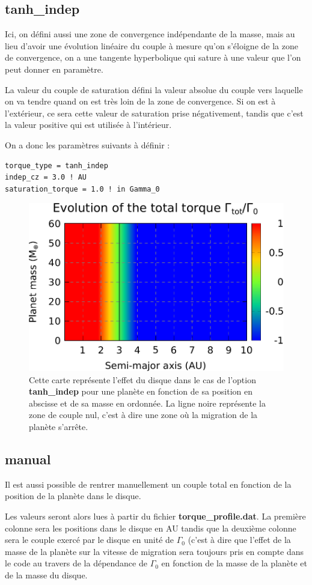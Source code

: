 \subsection{tanh\_indep}\label{sec:tanh_indep}
Ici, on défini aussi une zone de convergence indépendante de la masse, mais au lieu d'avoir une évolution linéaire du couple à mesure qu'on s'éloigne de la zone de convergence, on a une tangente hyperbolique qui sature à une valeur que l'on peut donner en paramètre. 

La valeur du couple de saturation défini la valeur absolue du couple vers laquelle on va tendre quand on est très loin de la zone de convergence. Si on est à l'extérieur, ce sera cette valeur de saturation prise négativement, tandis que c'est la valeur positive qui est utilisée à l'intérieur.

On a donc les paramètres suivants à définir : 
\begin{verbatim}
torque_type = tanh_indep
indep_cz = 3.0 ! AU
saturation_torque = 1.0 ! in Gamma_0
\end{verbatim}

\begin{figure}[htb]
\centering
\includegraphics[width=0.65\linewidth]{figure/migration_map/tanh_indep.pdf}
\caption{Cette carte représente l'effet du disque dans le cas de l'option \textbf{tanh\_indep} pour une planète en fonction de sa position en abscisse et de sa masse en ordonnée. La ligne noire représente la zone de couple nul, c'est à dire une zone où la migration de la planète s'arrête.}
\end{figure}

\subsection{manual}
Il est aussi possible de rentrer manuellement un couple total en fonction de la position de la planète dans le disque. 

Les valeurs seront alors lues à partir du fichier \textbf{torque\_profile.dat}. La première colonne sera les positions dans le disque en AU tandis que la deuxième colonne sera le couple exercé par le disque en unité de $\Gamma_0$ (c'est à dire que l'effet de la masse de la planète sur la vitesse de migration sera toujours pris en compte dans le code au travers de la dépendance de $\Gamma_0$ en fonction de la masse de la planète et de la masse du disque.

